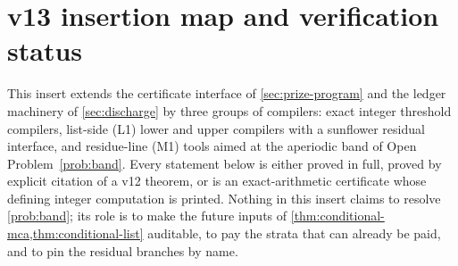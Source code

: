 \providecommand{\F}{\mathbb F}
\providecommand{\RS}{\mathrm{RS}}
\providecommand{\ImgFib}{\operatorname{ImgFib}}
\providecommand{\Paid}{\operatorname{Paid}}
\providecommand{\Dloc}{\mathcal D}
\providecommand{\PP}{\mathbb P}
\providecommand{\E}{\mathbb E}
\providecommand{\Var}{\operatorname{Var}}
\providecommand{\Span}{\operatorname{span}}
\providecommand{\ceil}[1]{\left\lceil #1\right\rceil}
\providecommand{\floor}[1]{\left\lfloor #1\right\rfloor}


\section{v13 insertion map and verification status}\label{sec:v13-map}

This insert extends the certificate interface of \cref{sec:prize-program} and the ledger machinery of \cref{sec:discharge} by three groups of compilers: exact integer threshold compilers, list-side (L1) lower and upper compilers with a sunflower residual interface, and residue-line (M1) tools aimed at the aperiodic band of Open Problem~\ref{prob:band}.  Every statement below is either proved in full, proved by explicit citation of a v12 theorem, or is an exact-arithmetic certificate whose defining integer computation is printed.  Nothing in this insert claims to resolve \cref{prob:band}; its role is to make the future inputs of \cref{thm:conditional-mca,thm:conditional-list} auditable, to pay the strata that can already be paid, and to pin the residual branches by name.

